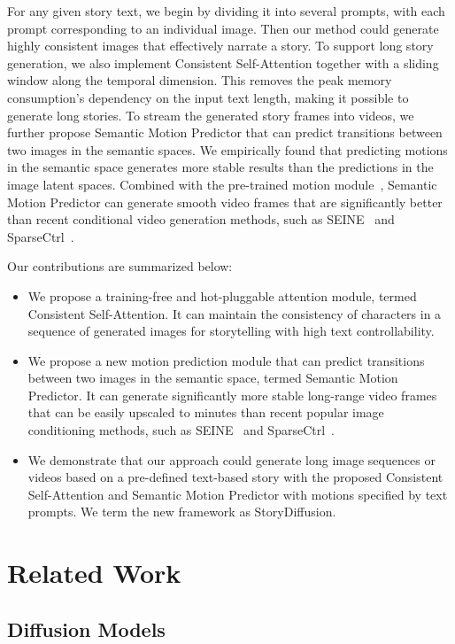 \documentclass{article} %
\newcommand{\nameofmethod}{StoryDiffusion}
\newcommand{\nameofsa}{Consistent Self-Attention}
\newcommand{\nameofmm}{Semantic Motion Predictor}
\begin{document}
For any given story text, we begin by dividing it into several prompts, with each prompt corresponding to an individual image.
Then our method could generate highly consistent images that effectively narrate a story.
%
To support long story generation, we also implement \nameofsa{} together with a sliding window along the temporal dimension. This removes the peak memory consumption's dependency on the input text length, making it possible to generate long stories. 
%
To stream the generated story frames into videos, we further propose \nameofmm{} that can predict transitions between two images in the semantic spaces. We empirically found that predicting motions in the semantic space generates more stable results than the predictions in the image latent spaces. Combined with the pre-trained motion module~\citep{guo2023animatediff}, \nameofmm{} can generate smooth video frames that are significantly better than recent conditional video generation methods, such as SEINE~\citep{chen2023seine} and SparseCtrl~\citep{guo2023sparsectrl}. 

Our contributions are summarized below:
\begin{itemize}
    \item We propose a training-free and hot-pluggable attention module, termed \nameofsa{}. It can maintain the consistency of characters in a sequence of generated images for storytelling with high text controllability.
    \item We propose a new motion prediction module that can predict transitions between two images in the semantic space, termed \nameofmm{}. It can generate significantly more stable long-range video frames that can be easily upscaled to minutes than recent popular image conditioning methods, such as SEINE~\citep{chen2023seine} and SparseCtrl~\citep{guo2023sparsectrl}.
    \item We demonstrate that our approach could generate long image sequences or videos based on a pre-defined text-based story with the proposed \nameofsa{} and \nameofmm{} with motions specified by text prompts. We term the new framework as \nameofmethod{}.
\end{itemize}


\section{Related Work}

\subsection{Diffusion Models}
\end{document}
